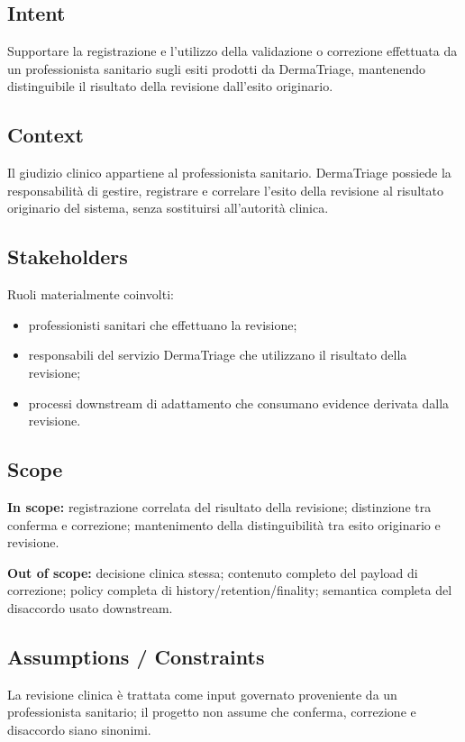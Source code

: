 \documentclass[11pt,a4paper]{article}
\begin{document}
\subsection{Intent}
Supportare la registrazione e l'utilizzo della validazione o correzione effettuata da un professionista sanitario sugli esiti prodotti da DermaTriage, mantenendo distinguibile il risultato della revisione dall'esito originario.

\subsection{Context}
Il giudizio clinico appartiene al professionista sanitario. DermaTriage possiede la responsabilità di gestire, registrare e correlare l'esito della revisione al risultato originario del sistema, senza sostituirsi all'autorità clinica.

\subsection{Stakeholders}
Ruoli materialmente coinvolti:
\begin{itemize}
\item professionisti sanitari che effettuano la revisione;
\item responsabili del servizio DermaTriage che utilizzano il risultato della revisione;
\item processi downstream di adattamento che consumano evidence derivata dalla revisione.
\end{itemize}

\subsection{Scope}
\textbf{In scope:} registrazione correlata del risultato della revisione; distinzione tra conferma e correzione; mantenimento della distinguibilità tra esito originario e revisione.

\textbf{Out of scope:} decisione clinica stessa; contenuto completo del payload di correzione; policy completa di history/retention/finality; semantica completa del disaccordo usato downstream.

\subsection{Assumptions / Constraints}
La revisione clinica è trattata come input governato proveniente da un professionista sanitario; il progetto non assume che conferma, correzione e disaccordo siano sinonimi.
\end{document}
